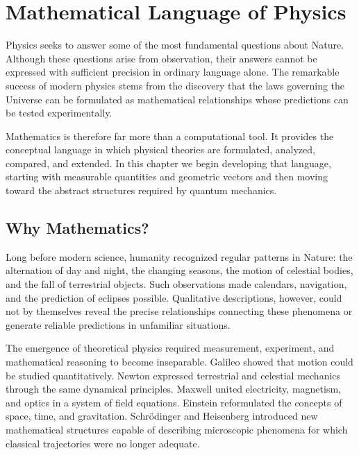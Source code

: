 
\section{Mathematical Language of Physics}
\label{sec:mathematical-language-of-physics}

Physics seeks to answer some of the most fundamental questions about Nature.
Although these questions arise from observation, their answers cannot be
expressed with sufficient precision in ordinary language alone. The remarkable
success of modern physics stems from the discovery that the laws governing the
Universe can be formulated as mathematical relationships whose predictions can
be tested experimentally.

Mathematics is therefore far more than a computational tool. It provides the
conceptual language in which physical theories are formulated, analyzed,
compared, and extended. In this chapter we begin developing that language,
starting with measurable quantities and geometric vectors and then moving
toward the abstract structures required by quantum mechanics.

\subsection{Why Mathematics?}
\label{subsec:why-mathematics}

Long before modern science, humanity recognized regular patterns in Nature: the
alternation of day and night, the changing seasons, the motion of celestial
bodies, and the fall of terrestrial objects. Such observations made calendars,
navigation, and the prediction of eclipses possible. Qualitative descriptions,
however, could not by themselves reveal the precise relationships connecting
these phenomena or generate reliable predictions in unfamiliar situations.

The emergence of theoretical physics required measurement, experiment, and
mathematical reasoning to become inseparable. Galileo showed that motion could
be studied quantitatively. Newton expressed terrestrial and celestial mechanics
through the same dynamical principles. Maxwell united electricity, magnetism,
and optics in a system of field equations. Einstein reformulated the concepts
of space, time, and gravitation. Schr\"odinger and Heisenberg introduced new
mathematical structures capable of describing microscopic phenomena for which
classical trajectories were no longer adequate.

